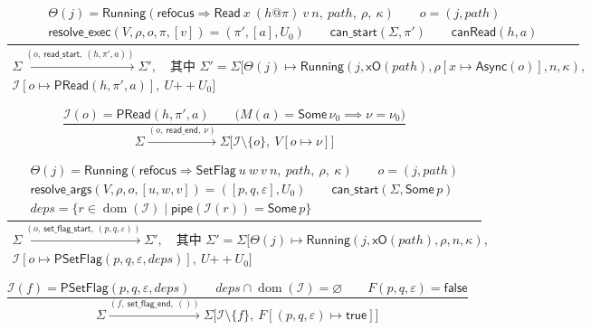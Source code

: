 \documentclass[UTF8,a4paper,11pt,fontset=fandol]{ctexart}
\newcommand{\kw}[1]{\mathsf{#1}}
\newcommand{\dom}{\operatorname{dom}}
\newcommand{\pipe}{\mathsf{pipe}}
\newcommand{\step}[1]{\xrightarrow{#1}}
\begin{document}
\[
\frac{
  \begin{gathered}
    \Theta(j) = \mathsf{Running}(\mathsf{refocus} \Rightarrow \kw{Read}\ x\ (h@\pi)\ v\ n,\ \mathit{path},\ \rho,\ \kappa)\qquad o=(j,\mathit{path})\\
    \mathsf{resolve\_exec}(V, \rho, o, \pi, [v]) = (\pi', [a], U_0)\qquad
    \mathsf{can\_start}(\Sigma, \pi')\qquad \mathsf{canRead}(h, a)
  \end{gathered}
}{
  \begin{gathered}
    \Sigma \step{(o,\ \kw{read\_start},\ (h,\pi',a))} \Sigma', \quad\text{其中 }
    \Sigma' = \Sigma\bigl[\Theta(j)\mapsto\mathsf{Running}(j, \kw{xO}(\mathit{path}), \rho[x\mapsto\kw{Async}(o)], n, \kappa),\\
    \mathcal I[o\mapsto\kw{PRead}(h,\pi',a)],\ U \mathrel{+\!\!+} U_0\bigr]
  \end{gathered}
}
\]

\[
\frac{
  \mathcal I(o) = \kw{PRead}(h,\pi',a) \qquad
  \bigl(M(a)=\kw{Some}\,\nu_0 \implies \nu=\nu_0\bigr)
}{
  \Sigma \step{(o,\ \kw{read\_end},\ \nu)}
  \Sigma\bigl[\mathcal I \setminus \{o\},\ V[o \mapsto \nu]\bigr]
}
\]

\[
\frac{
  \begin{gathered}
    \Theta(j) = \mathsf{Running}(\mathsf{refocus} \Rightarrow \kw{SetFlag}\ u\ w\ v\ n,\ \mathit{path},\ \rho,\ \kappa)\qquad o=(j,\mathit{path})\\
    \mathsf{resolve\_args}(V, \rho, o, [u,w,v]) = ([p,q,\varepsilon], U_0)\qquad
    \mathsf{can\_start}(\Sigma, \kw{Some}\,p)\\
    \mathit{deps} = \{r \in \dom(\mathcal I) \mid \pipe(\mathcal I(r)) = \kw{Some}\,p\}
  \end{gathered}
}{
  \begin{gathered}
    \Sigma \step{(o,\ \kw{set\_flag\_start},\ (p,q,\varepsilon))} \Sigma', \quad\text{其中 }
    \Sigma' = \Sigma\bigl[\Theta(j)\mapsto\mathsf{Running}(j, \kw{xO}(\mathit{path}), \rho, n, \kappa),\\
    \mathcal I[o\mapsto\kw{PSetFlag}(p,q,\varepsilon,\mathit{deps})],\ U \mathrel{+\!\!+} U_0\bigr]
  \end{gathered}
}
\]

\[
\frac{
  \mathcal I(f) = \kw{PSetFlag}(p,q,\varepsilon,\mathit{deps}) \qquad
  \mathit{deps} \cap \dom(\mathcal I) = \varnothing \qquad
  F(p,q,\varepsilon) = \kw{false}
}{
  \Sigma \step{(f,\ \kw{set\_flag\_end},\ ())}
  \Sigma\bigl[\mathcal I \setminus \{f\},\ F[(p,q,\varepsilon)\mapsto\kw{true}]\bigr]
}
\]
\end{document}
